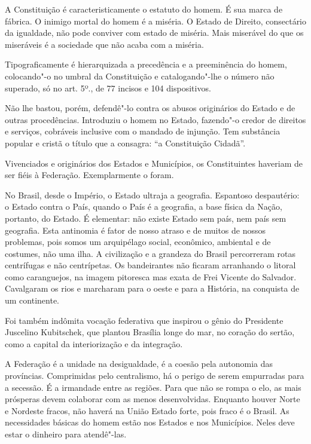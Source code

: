 A Constituição é caracteristicamente o estatuto do homem. É sua marca de
fábrica. O inimigo mortal do homem é a miséria. O Estado de Direito,
consectário da igualdade, não pode conviver com estado de miséria. Mais
miserável do que os miseráveis é a sociedade que não acaba com a
miséria.

Tipograficamente é hierarquizada a precedência e a preeminência do
homem, colocando"-o no umbral da Constituição e catalogando"-lhe o número
não superado, só no art. 5º., de 77 incisos e 104 dispositivos.

Não lhe bastou, porém, defendê"-lo contra os abusos originários do Estado
e de outras procedências. Introduziu o homem no Estado, fazendo"-o credor
de direitos e serviços, cobráveis inclusive com o mandado de injunção.
Tem substância popular e cristã o título que a consagra: ``a
Constituição Cidadã''.

Vivenciados e originários dos Estados e Municípios, os Constituintes
haveriam de ser fiéis à Federação. Exemplarmente o foram.

No Brasil, desde o Império, o Estado ultraja a geografia. Espantoso
despautério: o Estado contra o País, quando o País é a geografia, a base
física da Nação, portanto, do Estado. É elementar: não existe Estado sem
país, nem país sem geografia. Esta antinomia é fator de nosso atraso e
de muitos de nossos problemas, pois somos um arquipélago social,
econômico, ambiental e de costumes, não uma ilha. A civilização e a
grandeza do Brasil percorreram rotas centrífugas e não centrípetas. Os
bandeirantes não ficaram arranhando o litoral como caranguejos, na
imagem pitoresca mas exata de Frei Vicente do Salvador. Cavalgaram os
rios e marcharam para o oeste e para a História, na conquista de um
continente.

Foi também indômita vocação federativa que inspirou o gênio do
Presidente Juscelino Kubitschek, que plantou Brasília longe do mar, no
coração do sertão, como a capital da interiorização e da integração.

A Federação é a unidade na desigualdade, é a coesão pela autonomia das
províncias. Comprimidas pelo centralismo, há o perigo de serem
empurradas para a secessão. É a irmandade entre as regiões. Para que não
se rompa o elo, as mais prósperas devem colaborar com as menos
desenvolvidas. Enquanto houver Norte e Nordeste fracos, não haverá na
União Estado forte, pois fraco é o Brasil. As necessidades básicas do
homem estão nos Estados e nos Municípios. Neles deve estar o dinheiro
para atendê"-las.

